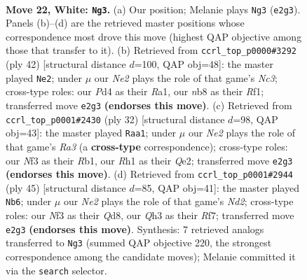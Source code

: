 \documentclass[11pt]{article}
\begin{document}
\clearpage

\begin{figure}[p]\centering
\begin{subfigure}{0.46\textwidth}\centering
\resizebox{\linewidth}{!}{%
\newchessgame
\chessboard[
  setfen={rn2r1k1/2pnq1pp/bp2p3/p2pPp2/3P1P1P/P4N1Q/1PPKN1P1/1R3B1R w - - 5 22},
  showmover=false,
  pgfstyle=straightmove, color=movearrow, markmove={e2-g3}
]}
\caption{}
\end{subfigure}\hfill
\begin{subfigure}{0.46\textwidth}\centering
\resizebox{\linewidth}{!}{%
\newchessgame
\chessboard[
  setfen={1rr3k1/2nq1pb1/p2p2pp/PppP3n/4P2B/2N1NP1P/1PQ3P1/R4R1K w - - 1 22},
  showmover=false,
  pgfstyle=straightmove, color=movearrow, markmove={c3-e2}
]}
\caption{}
\end{subfigure}
\\[4pt]
\begin{subfigure}{0.46\textwidth}\centering
\resizebox{\linewidth}{!}{%
\newchessgame
\chessboard[
  setfen={1rbqr1k1/2n1pp1p/pp4p1/2pPp3/P1B1P3/R1N4P/1PP1QPP1/1R4K1 w - - 0 17},
  showmover=false,
  pgfstyle=straightmove, color=movearrow, markmove={a3-a1}
]}
\caption{}
\end{subfigure}\hfill
\begin{subfigure}{0.46\textwidth}\centering
\resizebox{\linewidth}{!}{%
\newchessgame
\chessboard[
  setfen={r1bq2k1/1p1n1r1p/p2p2n1/2pPp3/B1P1PpP1/P1N2P1R/1P1QN3/2K4R b - - 3 23},
  showmover=false,
  pgfstyle=straightmove, color=movearrow, markmove={d7-b6}
]}
\caption{}
\end{subfigure}
\caption{\textbf{Move 22, White: \texttt{Ng3}.} (a) Our position; Melanie plays \texttt{Ng3} (\texttt{e2g3}). Panels (b)--(d) are the retrieved master positions whose correspondence most drove this move (highest QAP objective among those that transfer to it). (b) Retrieved from \texttt{ccrl\_top\_p0000\#3292} (ply 42) [structural distance $d$=100, QAP obj=48]: the master played \texttt{Ne2}; under $\mu$ our \emph{Ne2} plays the role of that game's \emph{Nc3}; cross-type roles: our \emph{P}d4 as their \emph{R}a1, our \emph{n}b8 as their \emph{R}f1; transferred move \texttt{e2g3} \textbf{(endorses this move)}. (c) Retrieved from \texttt{ccrl\_top\_p0001\#2430} (ply 32) [structural distance $d$=98, QAP obj=43]: the master played \texttt{Raa1}; under $\mu$ our \emph{Ne2} plays the role of that game's \emph{Ra3} (a \textbf{cross-type} correspondence); cross-type roles: our \emph{N}f3 as their \emph{R}b1, our \emph{R}h1 as their \emph{Q}e2; transferred move \texttt{e2g3} \textbf{(endorses this move)}. (d) Retrieved from \texttt{ccrl\_top\_p0001\#2944} (ply 45) [structural distance $d$=85, QAP obj=41]: the master played \texttt{Nb6}; under $\mu$ our \emph{Ne2} plays the role of that game's \emph{Nd2}; cross-type roles: our \emph{N}f3 as their \emph{Q}d8, our \emph{Q}h3 as their \emph{R}f7; transferred move \texttt{e2g3} \textbf{(endorses this move)}. Synthesis: 7 retrieved analogs transferred to \texttt{Ng3} (summed QAP objective 220, the strongest correspondence among the candidate moves); Melanie committed it via the \texttt{search} selector.}
\label{fig:thought-m42}
\end{figure}
\end{document}
